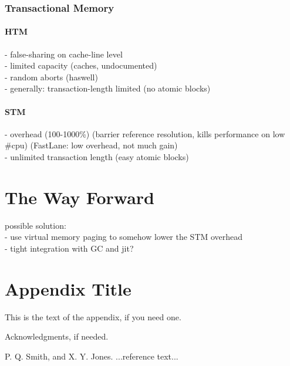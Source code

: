 \documentclass{sigplanconf}
\begin{document}
\subsubsection*{Transactional Memory}
\paragraph{HTM}

- false-sharing on cache-line level\\
- limited capacity (caches, undocumented)\\
- random aborts (haswell)\\
- generally: transaction-length limited (no atomic blocks)

\paragraph{STM}

- overhead (100-1000\%) (barrier reference resolution, kills performance on low \#cpu)
(FastLane: low overhead, not much gain)\\
- unlimited transaction length (easy atomic blocks)

\section{The Way Forward}
possible solution:\\
- use virtual memory paging to somehow lower the STM overhead\\
- tight integration with GC and jit?


\appendix
\section{Appendix Title}

This is the text of the appendix, if you need one.

\acks

Acknowledgments, if needed.





\begin{thebibliography}{}
\softraggedright

P. Q. Smith, and X. Y. Jones. ...reference text...

\end{thebibliography}
\end{document}
